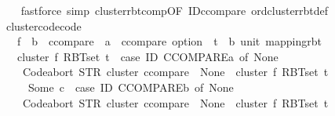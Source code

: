\begin{isabellebody}
\ \ \isamarkupfalse%
\ {\isacharparenleft}{\kern0pt}fastforce\ simp{\isacharcolon}{\kern0pt}\ cluster{\isacharunderscore}{\kern0pt}rbt{\isacharunderscore}{\kern0pt}comp{\isacharbrackleft}{\kern0pt}OF\ ID{\isacharunderscore}{\kern0pt}ccompare{\isacharprime}{\kern0pt}{\isacharbrackright}{\kern0pt}\ ord{\isachardot}{\kern0pt}cluster{\isacharunderscore}{\kern0pt}rbt{\isacharunderscore}{\kern0pt}def{\isacharparenright}{\kern0pt}%
\endisatagproof
{\isafoldproof}%
%
\isadelimproof
\isanewline
%
\endisadelimproof
\isanewline
{}\isamarkupfalse%
\ cluster{\isacharunderscore}{\kern0pt}code{\isacharbrackleft}{\kern0pt}code{\isacharbrackright}{\kern0pt}{\isacharcolon}{\kern0pt}\isanewline
\ \ \ f\ {\isacharcolon}{\kern0pt}{\isacharcolon}{\kern0pt}\ {\isachardoublequoteopen}{\isacharprime}{\kern0pt}b\ {\isacharcolon}{\kern0pt}{\isacharcolon}{\kern0pt}\ ccompare\ {\isasymRightarrow}\ {\isacharprime}{\kern0pt}a\ {\isacharcolon}{\kern0pt}{\isacharcolon}{\kern0pt}\ ccompare\ option{\isachardoublequoteclose}\ \ t\ {\isacharcolon}{\kern0pt}{\isacharcolon}{\kern0pt}\ {\isachardoublequoteopen}{\isacharparenleft}{\kern0pt}{\isacharprime}{\kern0pt}b{\isacharcomma}{\kern0pt}\ unit{\isacharparenright}{\kern0pt}\ mapping{\isacharunderscore}{\kern0pt}rbt{\isachardoublequoteclose}\isanewline
\ \ \ {\isachardoublequoteopen}cluster\ f\ {\isacharparenleft}{\kern0pt}RBT{\isacharunderscore}{\kern0pt}set\ t{\isacharparenright}{\kern0pt}\ {\isacharequal}{\kern0pt}\ {\isacharparenleft}{\kern0pt}case\ ID\ CCOMPARE{\isacharparenleft}{\kern0pt}{\isacharprime}{\kern0pt}a{\isacharparenright}{\kern0pt}\ of\ None\ {\isasymRightarrow}\isanewline
\ \ \ \ Code{\isachardot}{\kern0pt}abort\ {\isacharparenleft}{\kern0pt}STR\ {\isacharprime}{\kern0pt}{\isacharprime}{\kern0pt}cluster{\isacharcolon}{\kern0pt}\ ccompare\ {\isacharequal}{\kern0pt}\ None{\isacharprime}{\kern0pt}{\isacharprime}{\kern0pt}{\isacharparenright}{\kern0pt}\ {\isacharparenleft}{\kern0pt}{\isasymlambda}{\isacharunderscore}{\kern0pt}{\isachardot}{\kern0pt}\ cluster\ f\ {\isacharparenleft}{\kern0pt}RBT{\isacharunderscore}{\kern0pt}set\ t{\isacharparenright}{\kern0pt}{\isacharparenright}{\kern0pt}\isanewline
\ \ \ \ {\isacharbar}{\kern0pt}\ Some\ c\ {\isasymRightarrow}\ {\isacharparenleft}{\kern0pt}case\ ID\ CCOMPARE{\isacharparenleft}{\kern0pt}{\isacharprime}{\kern0pt}b{\isacharparenright}{\kern0pt}\ of\ None\ {\isasymRightarrow}\isanewline
\ \ \ \ Code{\isachardot}{\kern0pt}abort\ {\isacharparenleft}{\kern0pt}STR\ {\isacharprime}{\kern0pt}{\isacharprime}{\kern0pt}cluster{\isacharcolon}{\kern0pt}\ ccompare\ {\isacharequal}{\kern0pt}\ None{\isacharprime}{\kern0pt}{\isacharprime}{\kern0pt}{\isacharparenright}{\kern0pt}\ {\isacharparenleft}{\kern0pt}{\isasymlambda}{\isacharunderscore}{\kern0pt}{\isachardot}{\kern0pt}\ cluster\ f\ {\isacharparenleft}{\kern0pt}RBT{\isacharunderscore}{\kern0pt}set\ t{\isacharparenright}{\kern0pt}{\isacharparenright}{\kern0pt}\isanewline

\end{isabellebody}
